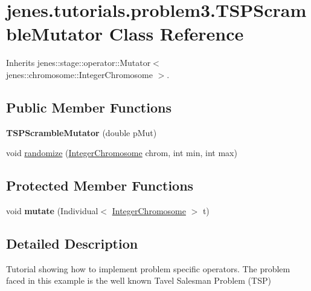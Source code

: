 \hypertarget{classjenes_1_1tutorials_1_1problem3_1_1_t_s_p_scramble_mutator}{
\section{jenes.tutorials.problem3.TSPScrambleMutator Class Reference}
\label{classjenes_1_1tutorials_1_1problem3_1_1_t_s_p_scramble_mutator}
}
Inherits jenes::stage::operator::Mutator$<$ jenes::chromosome::IntegerChromosome $>$.

\subsection*{Public Member Functions}
\begin{CompactItemize}
\item 
\hypertarget{classjenes_1_1tutorials_1_1problem3_1_1_t_s_p_scramble_mutator_405cbd7c659b7f1053399d0fa9a5b942}{
\textbf{TSPScrambleMutator} (double pMut)}
\label{classjenes_1_1tutorials_1_1problem3_1_1_t_s_p_scramble_mutator_405cbd7c659b7f1053399d0fa9a5b942}

\item 
void \hyperlink{classjenes_1_1tutorials_1_1problem3_1_1_t_s_p_scramble_mutator_42d01f9f0cd8138659b8e76fdc41cd1e}{randomize} (\hyperlink{classjenes_1_1chromosome_1_1_integer_chromosome}{IntegerChromosome} chrom, int min, int max)
\end{CompactItemize}
\subsection*{Protected Member Functions}
\begin{CompactItemize}
\item 
\hypertarget{classjenes_1_1tutorials_1_1problem3_1_1_t_s_p_scramble_mutator_b355f07bb36d37f05a81eac0cc110b42}{
void \textbf{mutate} (Individual$<$ \hyperlink{classjenes_1_1chromosome_1_1_integer_chromosome}{IntegerChromosome} $>$ t)}
\label{classjenes_1_1tutorials_1_1problem3_1_1_t_s_p_scramble_mutator_b355f07bb36d37f05a81eac0cc110b42}

\end{CompactItemize}


\subsection{Detailed Description}
Tutorial showing how to implement problem specific operators. The problem faced in this example is the well known Tavel Salesman Problem (TSP)


